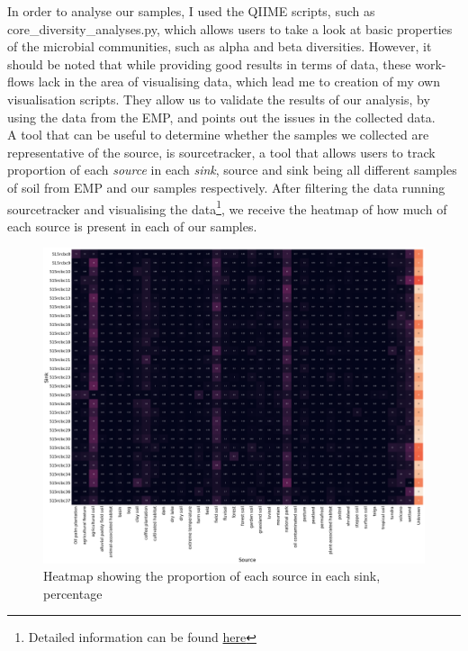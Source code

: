 \documentclass{article}
\begin{document}
\begin{multicols}{2}
In order to analyse our samples, I used the QIIME scripts, such as core\_diversity\_analyses.py, which allows users to take a look at basic properties of the microbial communities, such as alpha and beta diversities. However, it should be noted that while providing good results in terms of data, these work-flows lack in the area of visualising data, which lead me to creation of my own visualisation scripts\cite{Anonymous2018}. They allow us to validate the results of our analysis, by using the data from the EMP, and points out the issues in the collected data.\\
%
A tool that can be useful to determine whether the samples we collected are representative of the source, is sourcetracker\cite{Knights2011}, a tool that allows users to track proportion of each \textit{source} in each \textit{sink}, source and sink being all different samples of soil from EMP and our samples respectively. After filtering the data running sourcetracker and visualising the data\footnote{Detailed information can be found \href{https://github.com/nameisBaron-MichaelBaron/BIOC3301/tree/master/sourcetracker}{here}}, we receive the heatmap of how much of each source is present in each of our samples.
\end{multicols}
\begin{figure}[H]
	\includegraphics[width=\textwidth]{../sourcetracker/heatmap_perc.png}
	\caption{Heatmap showing the proportion of each source in each sink, percentage}
	\label{fig:sourcetracker_heatmap}
\end{figure}
\end{document}
